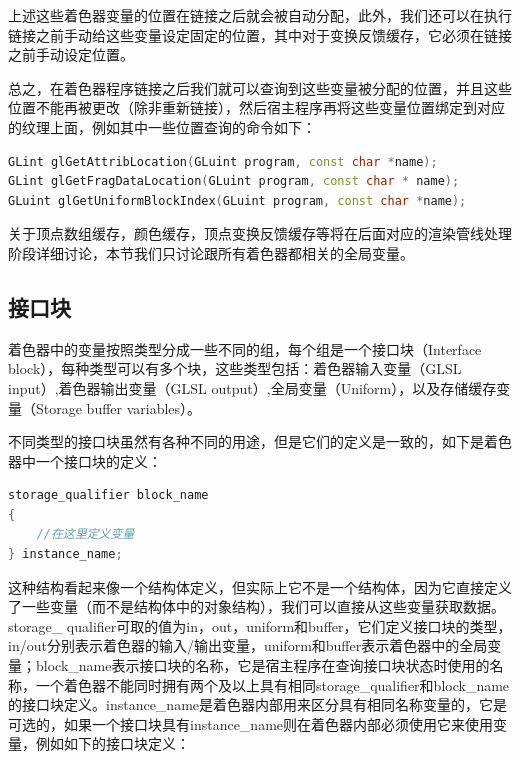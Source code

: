上述这些着色器变量的位置在链接之后就会被自动分配，此外，我们还可以在执行链接之前手动给这些变量设定固定的位置，其中对于变换反馈缓存，它必须在链接之前手动设定位置。

总之，在着色器程序链接之后我们就可以查询到这些变量被分配的位置，并且这些位置不能再被更改（除非重新链接），然后宿主程序再将这些变量位置绑定到对应的纹理上面，例如其中一些位置查询的命令如下：

\begin{lstlisting}[language=C++]
GLint glGetAttribLocation​(GLuint program​, const char *name​);
GLint glGetFragDataLocation​(GLuint program​, const char * name​);
GLuint glGetUniformBlockIndex​(GLuint program​​, const char *name​​);
\end{lstlisting}


关于顶点数组缓存，颜色缓存，顶点变换反馈缓存等将在后面对应的渲染管线处理阶段详细讨论，本节我们只讨论跟所有着色器都相关的全局变量。





\subsection{接口块}\label{sec:api-interface-block}
着色器中的变量按照类型分成一些不同的组，每个组是一个接口块（Interface block），每种类型可以有多个块，这些类型包括：着色器输入变量（GLSL input）,着色器输出变量（GLSL output）,全局变量（Uniform），以及存储缓存变量（Storage buffer variables）。

不同类型的接口块虽然有各种不同的用途，但是它们的定义是一致的，如下是着色器中一个接口块的定义：

\begin{lstlisting}[language=C++]
storage_qualifier block_name
{
	//在这里定义变量
} instance_name;
\end{lstlisting}

这种结构看起来像一个结构体定义，但实际上它不是一个结构体，因为它直接定义了一些变量（而不是结构体中的对象结构），我们可以直接从这些变量获取数据。storage\_ qualifier可取的值为in，out，uniform和buffer，它们定义接口块的类型，in/out分别表示着色器的输入/输出变量，uniform和buffer表示着色器中的全局变量；block\_name表示接口块的名称，它是宿主程序在查询接口块状态时使用的名称，一个着色器不能同时拥有两个及以上具有相同storage\_qualifier和block\_name的接口块定义。instance\_name是着色器内部用来区分具有相同名称变量的，它是可选的，如果一个接口块具有instance\_name则在着色器内部必须使用它来使用变量，例如如下的接口块定义：

